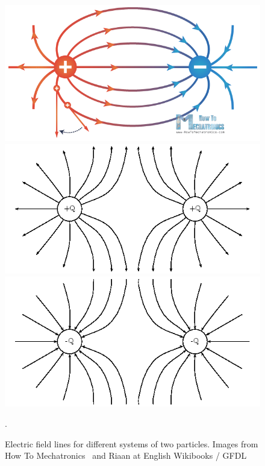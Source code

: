 \begin{figure}
    \centering
    \includegraphics[width=.8\textwidth]{Figures/dipole}
    \includegraphics[width=.8\textwidth]{Figures/like_positive}
    \includegraphics[width=.8\textwidth]{Figures/like_negative}
    \caption{Electric field lines for different systems of two particles.
    Images from How To Mechatronics~\cite{htm} and Riaan at English Wikibooks / GFDL~\cite{like_pos,like_neg}}.
    \label{fig:field_lines}
\end{figure}
